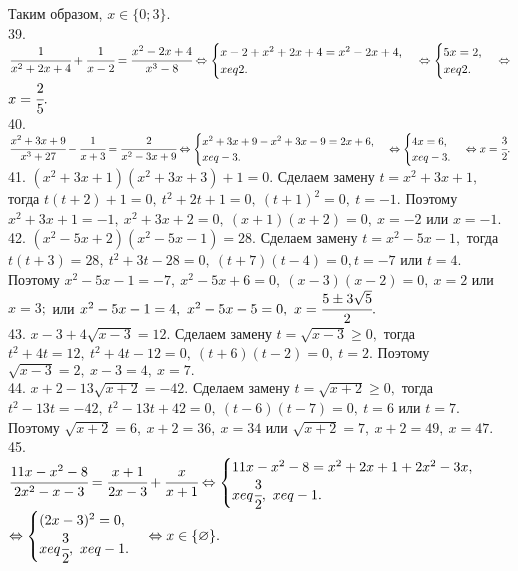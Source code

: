 Таким образом, $x\in\{0; 3\}.$\\
39. $\cfrac{1}{x^2+2x+4}+\cfrac{1}{x-2}=\cfrac{x^2-2x+4}{x^3-8}\Leftrightarrow \begin{cases}x-2+x^2+2x+4=x^2-2x+4,\\ x
eq2.\end{cases}
\Leftrightarrow \begin{cases}5x=2,\\ x
eq2.\end{cases}\Leftrightarrow$\\$ x=\cfrac{2}{5}.$\\
40. $\cfrac{x^2+3x+9}{x^3+27}-\cfrac{1}{x+3}=\cfrac{2}{x^2-3x+9}\Leftrightarrow \begin{cases}x^2+3x+9-x^2+3x-9=2x+6,\\ x
eq-3.\end{cases}
\Leftrightarrow\begin{cases} 4x=6,\\ x
eq-3.\end{cases}\Leftrightarrow x=\cfrac{3}{2}.$\\
41. $(x^2+3x+1)(x^2+3x+3)+1=0.$ Сделаем замену $t=x^2+3x+1,$ тогда $t(t+2)+1=0,\ t^2+2t+1=0,\ (t+1)^2=0,\ t=-1.$ Поэтому $x^2+3x+1=-1,\
x^2+3x+2=0,\ (x+1)(x+2)=0,\ x=-2$ или $x=-1.$\\
42. $(x^2-5x+2)(x^2-5x-1)=28.$ Сделаем замену $t=x^2-5x-1,$ тогда $t(t+3)=28,\ t^2+3t-28=0,\ (t+7)(t-4)=0, t=-7$ или $t=4.$ Поэтому $x^2-5x-1=-7,\ x^2-5x+6=0,\
(x-3)(x-2)=0,\ x=2$ или $x=3;$ или $x^2-5x-1=4,\ x^2-5x-5=0,\ x=\cfrac{5\pm3\sqrt{5}}{2}.$\\
43. $x-3+4\sqrt{x-3}=12.$ Сделаем замену $t=\sqrt{x-3}\geqslant0,$ тогда $t^2+4t=12,\ t^2+4t-12=0,\ (t+6)(t-2)=0,\ t=2.$ Поэтому $\sqrt{x-3}=2,\ x-3=4,\ x=7.$\\
44. $x+2-13\sqrt{x+2}=-42.$ Сделаем замену $t=\sqrt{x+2}\geqslant0,$ тогда $t^2-13t=-42,\ t^2-13t+42=0,\ (t-6)(t-7)=0,\ t=6$ или $t=7.$ Поэтому $\sqrt{x+2}=6,\ x+2=36,\ x=34$ или $\sqrt{x+2}=7,\ x+2=49,\ x=47.$\\
45. $\cfrac{11x-x^2-8}{2x^2-x-3}=\cfrac{x+1}{2x-3}+\cfrac{x}{x+1}\Leftrightarrow \begin{cases} 11x-x^2-8=x^2+2x+1+2x^2-3x,\\ x
eq\cfrac{3}{2},\ x
eq-1.\end{cases}$\\$
\Leftrightarrow \begin{cases} (2x-3)^2=0,\\ x
eq\cfrac{3}{2},\ x
eq-1.\end{cases}\Leftrightarrow x\in\{\varnothing\}.$\\
